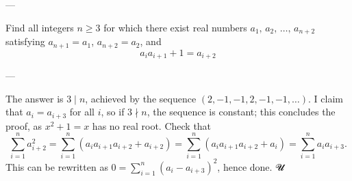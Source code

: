 
---

Find all integers $n\ge3$ for which there exist real numbers $a_1,\,a_2,\,\ldots,\,a_{n+2}$ satisfying $a_{n+1}=a_1$, $a_{n+2}=a_2$, and \[a_ia_{i+1}+1=a_{i+2}\]

---

The answer is $3\mid n$, achieved by the sequence $(2,-1,-1,2,-1,-1,\ldots)$. I claim that $a_i=a_{i+3}$ for all $i$, so if $3\nmid n$, the sequence is constant; this concludes the proof, as $x^2+1=x$ has no real root. Check that \[\sum_{i=1}^na_{i+2}^2=\sum_{i=1}^n\left(a_ia_{i+1}a_{i+2}+a_{i+2}\right)=\sum_{i=1}^n\left(a_ia_{i+1}a_{i+2}+a_i\right)=\sum_{i=1}^na_ia_{i+3}.\]
This can be rewritten as $0=\sum_{i=1}^n\left(a_i-a_{i+3}\right)^2$, hence done.
𝓤
